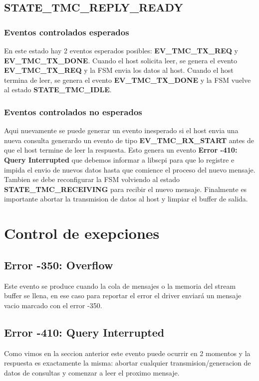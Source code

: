 \subsection{STATE\_TMC\_REPLY\_READY}
\subsubsection{Eventos controlados esperados}
En este estado hay 2 eventos esperados posibles: \textbf{EV\_TMC\_TX\_REQ} y \textbf{EV\_TMC\_TX\_DONE}. Cuando el host solicita leer, se genera el evento \textbf{EV\_TMC\_TX\_REQ} y la FSM envia los datos al host. Cuando el host termina de leer, se genera el evento \textbf{EV\_TMC\_TX\_DONE} y la FSM vuelve al estado \textbf{STATE\_TMC\_IDLE}.

\subsubsection{Eventos controlados no esperados}
Aqui nuevamente se puede generar un evento inesperado si el host envia una nueva consulta generardo un evento de tipo \textbf{EV\_TMC\_RX\_START} antes de que el host termine de leer la respuesta. Esto genera un evento \textbf{Error -410: Query Interrupted} que debemos informar a libscpi para que lo registre e impida el envio de nuevos datos hasta que comience el proceso del nuevo mensaje. Tambien se debe reconfigurar la FSM volviendo al estado \textbf{STATE\_TMC\_RECEIVING} para recibir el nuevo mensaje. Finalmente es importante abortar la transmision de datos al host y limpiar el buffer de salida.

\section{Control de exepciones}
\subsection{Error -350: Overflow}
Este evento se produce cuando la cola de mensajes o la memoria del stream buffer se llena, en ese caso para reportar el error el driver enviará un mensaje vacio marcado con el error -350.

\subsection{Error -410: Query Interrupted}
Como vimos en la seccion anterior este evento puede ocurrir en 2 momentos y la respuesta es exactamente la misma: abortar cualquier transmision/generacion de datos de consultas y comenzar a leer el proximo mensaje.

